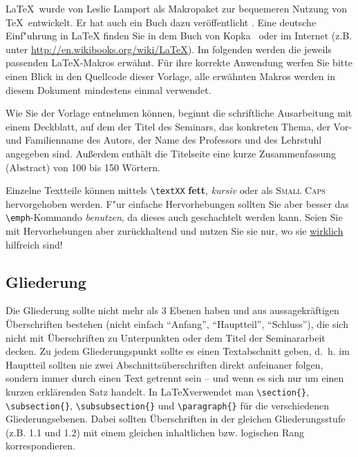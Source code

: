 \documentclass[final,bibliography=totocnumbered]{include/sikseminar}
\begin{document}
\LaTeX\ wurde von Leslie Lamport als Makropaket zur bequemeren Nutzung von \TeX\ entwickelt. Er hat auch ein Buch dazu veröffentlicht \cite{lamport94latex}. Eine deutsche Einf"uhrung in \LaTeX{} finden Sie in dem Buch von
Kopka~\cite{kopka00latex1} oder im Internet (z.B. unter \url{http://en.wikibooks.org/wiki/LaTeX}). Im folgenden werden die jeweils passenden \LaTeX-Makros erwähnt. Für ihre korrekte Anwendung werfen Sie bitte einen Blick in den Quellcode dieser Vorlage, alle erwähnten Makros werden in diesem Dokument mindestens einmal verwendet.

Wie Sie der Vorlage entnehmen können, beginnt die schriftliche Ausarbeitung mit einem Deckblatt, auf dem der Titel des Seminars, das konkreten Thema, der Vor- und Familienname des Autors, der Name des Professors und des Lehrstuhl angegeben sind. Außerdem enthält die Titelseite eine kurze Zusammenfassung (Abstract) von 100 bis 150 Wörtern.

Einzelne Textteile können mittels \verb+\textXX+ \textbf{fett}, \textit{kursiv} oder als \textsc{Small Caps} hervorgehoben werden. F"ur einfache Hervorhebungen sollten Sie aber besser das \verb+\emph+-Kommando \emph{benutzen}, da dieses auch geschachtelt werden kann. Seien Sie mit Hervorhebungen aber zurückhaltend und nutzen Sie sie nur, wo sie \underline{wirklich} hilfreich sind!

\subsection{Gliederung}
\label{hinweise:gliederung}
Die Gliederung sollte nicht mehr als 3 Ebenen haben und aus aussagekräftigen Überschriften bestehen (nicht einfach ``Anfang'', ``Hauptteil'', ``Schluss''), die sich nicht mit Überschriften zu Unterpunkten oder dem Titel der Seminararbeit decken. Zu jedem Gliederungspunkt sollte es einen Textabschnitt geben, d.~h. im Hauptteil sollten nie zwei Abschnittsüberschriften direkt aufeinaner folgen, sondern immer durch einen Text getrennt sein -- und wenn es sich nur um einen kurzen erklärenden Satz handelt. In \LaTeX verwendet man \verb+\section{}+, \verb+\subsection{}+, \verb+\subsubsection{}+ und \verb+\paragraph{}+ für die verschiedenen Gliederungsebenen. Dabei sollten Überschriften in der gleichen Gliederungsstufe (z.B. 1.1 und 1.2) mit einem gleichen inhaltlichen bzw. logischen Rang korrespondieren.
\end{document}
